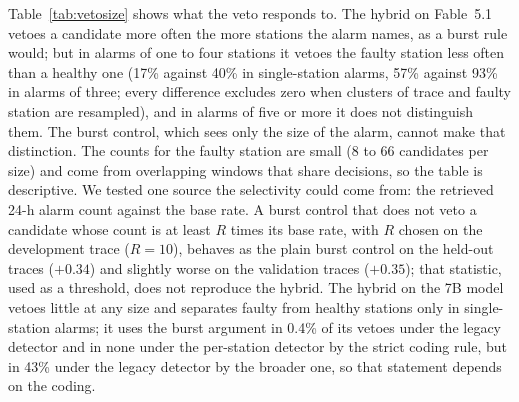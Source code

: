 \documentclass[preprint,11pt]{elsarticle}
\begin{document}
Table~\ref{tab:vetosize} shows what the veto responds to. The hybrid on Fable~5.1 vetoes a candidate more often the more stations the alarm names, as a burst rule would; but in alarms of one to four stations it vetoes the faulty station less often than a healthy one (17\% against 40\% in single-station alarms, 57\% against 93\% in alarms of three; every difference excludes zero when clusters of trace and faulty station are resampled), and in alarms of five or more it does not distinguish them. The burst control, which sees only the size of the alarm, cannot make that distinction. The counts for the faulty station are small (8 to 66 candidates per size) and come from overlapping windows that share decisions, so the table is descriptive. We tested one source the selectivity could come from: the retrieved 24-h alarm count against the base rate. A burst control that does not veto a candidate whose count is at least $R$ times its base rate, with $R$ chosen on the development trace ($R=10$), behaves as the plain burst control on the held-out traces ($+0.34$) and slightly worse on the validation traces ($+0.35$); that statistic, used as a threshold, does not reproduce the hybrid. The hybrid on the 7B model vetoes little at any size and separates faulty from healthy stations only in single-station alarms; it uses the burst argument in 0.4\% of its vetoes under the legacy detector and in none under the per-station detector by the strict coding rule, but in 43\% under the legacy detector by the broader one, so that statement depends on the coding.

\begin{table}[t]
\centering
\caption{Share of the change test's candidates that each hybrid vetoes, by the number of stations named in the alarm behind the call, from the fault onset on; held-out traces, per-station detector. Recomputed by replaying the stored decisions. In brackets: 95\% interval from a bootstrap over the 24 clusters of trace and faulty station; $n$: candidates of the faulty station.}
\label{tab:vetosize}
\small
{}
\end{table}
\end{document}

